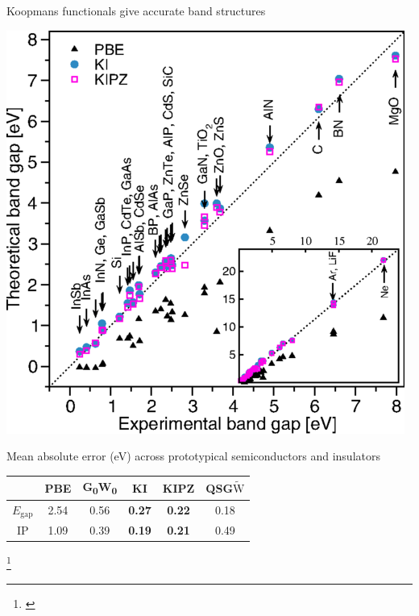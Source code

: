 \documentclass[xcolor=table,aspectratio=169]{beamer}
\newcommand\blfootcite[1]{%
  \begingroup
  \renewcommand\thefootnote{}\footnote{\hspace{-4ex}\cite{#1}}%
  \addtocounter{footnote}{-1}%
  \endgroup
}
\numberwithin{equation}{section}
\begin{document}
\begin{frame}{\normalsize Koopmans functionals give accurate band structures}
   \begin{minipage}[c]{0.35\textwidth}
      \includegraphics[width=\textwidth]{figures/fig_nguyen_prx_bandgaps.png}
   \end{minipage}
   \hspace{1em}
   \begin{minipage}[c]{0.6\textwidth}

      \footnotesize
      Mean absolute error (eV) across prototypical semiconductors and insulators

      \vspace{1ex}
      \begin{tabular}{c S[table-format = 2.2] S[table-format = 2.2] >{\color{seaborn_red}\bfseries}S[table-format = 2.2] >{\color{seaborn_red}\bfseries}S[table-format = 2.2] S[table-format = 2.2]}
                          & {PBE} & {G\textsubscript{0}W\textsubscript{0}} & {KI} & {KIPZ} & {QSG$\tilde{\mathrm{W}}$} \\
         \midrule
         \midrule
         $E_\mathrm{gap}$ & 2.54  & 0.56                                   & 0.27 & 0.22   & 0.18                      \\
         \midrule
         IP               & 1.09  & 0.39                                   & 0.19 & 0.21   & 0.49                      \\
      \end{tabular}
   \end{minipage}

   \blfootcite{Nguyen2018}
\end{frame}
\end{document}
